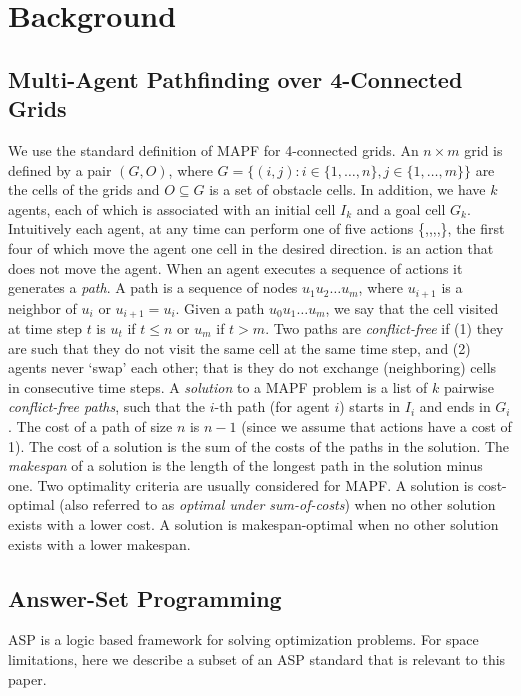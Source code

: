 \section{Background}

\subsection{Multi-Agent Pathfinding over 4-Connected Grids}
We use the standard definition of MAPF for 4-connected grids. An $n\times m$ grid is defined by a pair $(G,O)$, where $G=\{(i,j):i\in\{1,\ldots,n\}, j\in\{1,\ldots,m\}\}$ are the cells of the grids and $O\subseteq G$ is a set of obstacle cells. In addition, we have $k$ agents, each of which is associated with an initial cell $I_k$ and a goal cell $G_k$. Intuitively each agent, at any time can perform one of five actions \{\Up,\Down,\Left,\Right,\Wait\}, the first four of which move the agent one cell in the desired direction. \Wait is an action that does not move the agent. When an agent executes a sequence of actions it generates a \emph{path}. A path is a sequence of nodes $u_1u_2\ldots u_m$, where $u_{i+1}$ is a neighbor of $u_i$ or $u_{i+1}=u_i$.  Given a path $u_0u_1\ldots u_m$, we say that the cell visited at time step $t$ is $u_t$ if $t\leq n$ or $u_m$ if $t>m$. Two paths are \emph{conflict-free} if (1) they are such that they do not visit the same cell at the same time step, and (2) agents never `swap' each other; that is they do not exchange (neighboring) cells in consecutive time steps.  A \emph{solution} to a MAPF problem is a list of $k$ pairwise \emph{conflict-free paths}, such that the $i$-th path (for agent $i$) starts in $I_i$ and ends in $G_i$. The cost of a path of size $n$ is $n-1$ (since we assume that actions have a cost of 1). The cost of a solution is the sum of the costs of the paths in the solution. The \emph{makespan} of a solution is the length of the longest path in the solution minus one. Two optimality criteria are usually considered for MAPF. A solution is cost-optimal (also referred to as \emph{optimal under sum-of-costs}) when no other solution exists with a lower cost. A solution is makespan-optimal when no other solution exists with a lower makespan.

\subsection{Answer-Set Programming}
ASP \cite{paper-de-lifschitz-what-is-ASP} is a logic based framework for solving optimization problems. For space limitations, here we describe a subset of an ASP standard that is relevant to this paper. 

